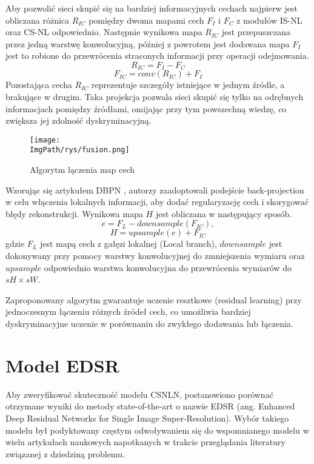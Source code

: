 \documentclass[a4paper,12pt,twoside,openany]{report}
\newcommand{\ImgPath}{.}
\begin{document}
	Aby pozwolić sieci skupić się na bardziej informacyjnych cechach najpierw jest obliczana różnica $R_{IC}$ pomiędzy dwoma mapami cech $F_I$ i $F_C$ z modułów IS-NL oraz CS-NL odpowiednio. Następnie wynikowa mapa $R_{IC}$ jest przepuszczana przez jedną warstwę konwolucyjną, później z powrotem jest dodawana mapa $F_I$ jest to robione do przewrócenia straconych informacji przy operacji odejmowania.
	\begin{equation}
		R_{IC}  = F_I - F_C
		\label{RIC}
	\end{equation}
	\begin{equation}
		F_{IC} = conv(R_{IC}) + F_I
 		\label{FIC}
	\end{equation}
	Pozostająca cecha $R_{IC}$ reprezentuje szczegóły istniejące w jednym źródle, a brakujące w drugim. Taka projekcja pozwala sieci skupić się tylko na odrębnych informacjach pomiędzy źródłami, omijając przy tym powszechną wiedzę, co zwiększa jej zdolność dyskryminacyjną.
	\begin{figure}[!htbp]
		\begin{center}
			\centering
			\texttt{[image: \\ImgPath/rys/fusion.png]}
		\end{center}
		\caption{Algorytm lączenia map cech}
		\label{Fusion}
	\end{figure} 
	
	Wzorując się artykułem DBPN \cite{DBPN}, autorzy zaadoptowali podejście back-projection w celu włączenia lokalnych informacji, aby dodać regularyzację cech i skorygować błędy rekonstrukcji. Wynikowa mapa $H$ jest obliczana w następujący sposób. 
	\begin{equation}
		e = F_L - downsample(F_{IC}),
		\label{RIC}
	\end{equation}
	\begin{equation}
		H = upsample(e) + F_{IC}
		\label{FIC}
	\end{equation}
	gdzie $F_L$ jest mapą cech z gałęzi lokalnej (Local branch), $downsample$ jest dokonywany przy pomocy warstwy konwolucyjnej do zmniejszenia wymiaru oraz $upsample$ odpowiednio warstwa konwolucyjna do przewrócenia wymiarów do $sH \times sW$.
	
	Zaproponowany algorytm gwarantuje uczenie resztkowe (residual learning) przy jednoczesnym łączeniu różnych źródeł cech, co umożliwia bardziej dyskryminacyjne uczenie w porównaniu do zwykłego dodawania lub łączenia.
\newpage
\section{Model EDSR}
	Aby zweryfikować skuteczność modelu CSNLN, postanowiono porównać otrzymane wyniki do metody state-of-the-art o nazwie EDSR \cite{EDSR} (ang. Enhanced Deep Residual Networks for Single Image Super-Resolution). Wybór takiego modelu był podyktowany częstym odwoływaniem się do wspomnianego modelu w wielu artykułach naukowych napotkanych w trakcie przeglądania literatury związanej z dziedziną problemu.
	
\end{document}
